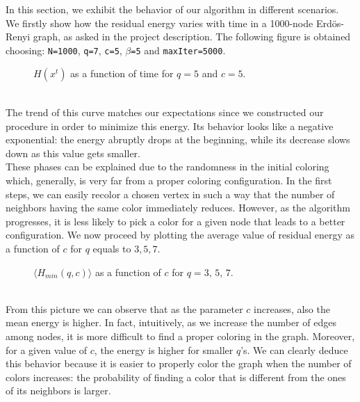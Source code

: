 In this section, we exhibit the behavior of our algorithm in different scenarios.\\
We firstly show how the residual energy varies with time in a 1000-node Erd\"os-Renyi graph, as asked in the project description.
The following figure is obtained choosing: \texttt{N=1000}, \texttt{q=7}, \texttt{c=5}, \texttt{$\beta$=5} and \texttt{maxIter=5000}.
\begin{figure}[h]
	\centering
	\setlength\figureheight{6cm} 		
	\setlength{}
	
	\vspace{-0.3cm}
	\caption{$H(x^t)$ as a function of time for $q=5$ and $c=5.$} 
	\label{energy}
\end{figure}\\
The trend of this curve matches our expectations since we constructed our procedure in order to minimize this energy.
Its behavior looks like a negative exponential: the energy abruptly drops at the beginning, while its decrease slows down as this value gets smaller.\\
These phases can be explained due to the randomness in the initial coloring which, generally, is very far from a proper coloring configuration.
In the first steps, we can easily recolor a chosen vertex in such a way that the number of neighbors having the same color immediately reduces.
However, as the algorithm progresses, it is less likely to pick a color for a given node that leads to a better configuration.
\newline\indent
We now proceed by plotting the average value of residual energy as a function of $c$ for $q$ equals to $3,5,7$.
\begin{figure}[h]
	\centering
	\setlength\figureheight{6cm} 		
	\setlength{}
	
	\vspace{-0.3cm}
	\caption{$\langle H_{min}(q,c)\rangle$ as a function of $c$ for $q=3,\,5,\,7.$}
	\label{fig:botta}
\end{figure}\\
From this picture we can observe that as the parameter $c$ increases, also the mean energy is higher.
In fact, intuitively, as we increase the number of edges among nodes, it is more difficult to find a proper coloring in the graph.
Moreover, for a given value of $c$, the energy is higher for smaller $q$'s.
We can clearly deduce this behavior because it is easier to properly color the graph when the number of colors increases: the probability of finding a color that is different from the ones of its neighbors is larger.\\
